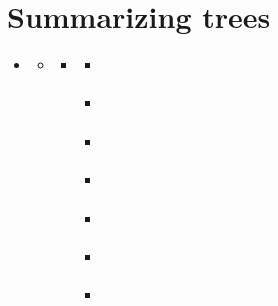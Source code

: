 \documentclass[letterpaper,10pt,english]{sphinxmanual}
\begin{document}
\chapter{Summarizing trees}
\label{\detokenize{summary:summarizing-trees}}\label{\detokenize{summary::doc}}
\begin{sphinxShadowBox}
\begin{itemize}
\item {} 
\sphinxAtStartPar
{}\label{\detokenize{summary:id1}}{\hyperref[\detokenize{summary:summarizing-trees}]{}}
\begin{itemize}
\item {} 
\sphinxAtStartPar
{}\label{\detokenize{summary:id2}}{\hyperref[\detokenize{summary:the-centroid-class}]{}}
\begin{itemize}
\item {} 
\sphinxAtStartPar
{}\label{\detokenize{summary:id3}}{\hyperref[\detokenize{summary:variation}]{}}
\begin{itemize}
\item {} 
\sphinxAtStartPar
{}\label{\detokenize{summary:id4}}{\hyperref[\detokenize{summary:greedy}]{}}

\item {} 
\sphinxAtStartPar
{}\label{\detokenize{summary:id5}}{\hyperref[\detokenize{summary:inc-sub}]{}}

\item {} 
\sphinxAtStartPar
{}\label{\detokenize{summary:id6}}{\hyperref[\detokenize{summary:iter-sub}]{}}

\item {} 
\sphinxAtStartPar
{}\label{\detokenize{summary:id7}}{\hyperref[\detokenize{summary:separate}]{}}

\item {} 
\sphinxAtStartPar
{}\label{\detokenize{summary:id8}}{\hyperref[\detokenize{summary:onlyone}]{}}

\item {} 
\sphinxAtStartPar
{}\label{\detokenize{summary:id9}}{\hyperref[\detokenize{summary:update-with-one}]{}}

\item {} 
\sphinxAtStartPar
{}\label{\detokenize{summary:id10}}{\hyperref[\detokenize{summary:online}]{}}


\end{itemize}
\end{itemize}
\end{itemize}
\end{itemize}
\end{sphinxShadowBox}
\end{document}
